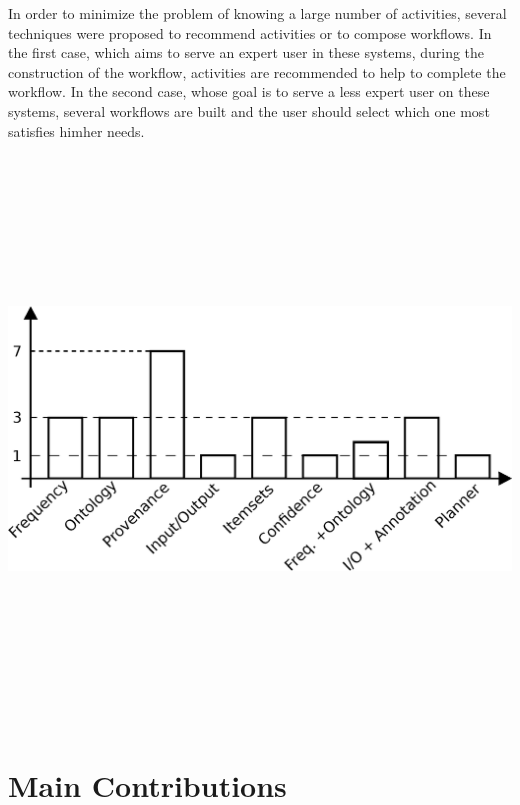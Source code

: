 \documentclass[a0, portrait]{a0poster}
\begin{document}
\begin{multicols}{2}
In order to minimize the problem of knowing a large number of activities, several techniques were proposed to recommend activities or to compose workflows. In the first case, which aims to serve an expert user in these systems, during the construction of the workflow, activities are recommended to help to complete the workflow. In the second case, whose goal is to serve a less expert user on these systems, several workflows are built and the user should select which one most satisfies him\/her needs.
\begin{center}
\includegraphics[height=15cm, width=28cm]{novos/QuantidadeTecnica.eps}
\end{center}


\section*{Main Contributions}


\end{multicols}
\end{document}
